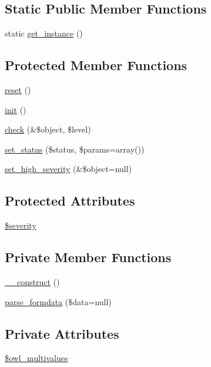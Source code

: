 \subsection*{Static Public Member Functions}
\begin{DoxyCompactItemize}
\item 
static \hyperlink{classFormHandler_ad5b352905583faed17034459f1a9ea6c}{get\_\-instance} ()
\end{DoxyCompactItemize}
\subsection*{Protected Member Functions}
\begin{DoxyCompactItemize}
\item 
\hyperlink{class__OWL_a2f2a042bcf31965194c03033df0edc9b}{reset} ()
\item 
\hyperlink{class__OWL_ae0ef3ded56e8a6b34b6461e5a721cd3e}{init} ()
\item 
\hyperlink{class__OWL_ad6f4f6946f40199dd0333cf219fa500e}{check} (\&\$object, \$level)
\item 
\hyperlink{class__OWL_aea912d0ede9b3c2a69b79072d94d4787}{set\_\-status} (\$status, \$params=array())
\item 
\hyperlink{class__OWL_a576829692a3b66e3d518853bf43abae3}{set\_\-high\_\-severity} (\&\$object=null)
\end{DoxyCompactItemize}
\subsection*{Protected Attributes}
\begin{DoxyCompactItemize}
\item 
\hyperlink{class__OWL_ad26b40a9dbbacb33e299b17826f8327c}{\$severity}
\end{DoxyCompactItemize}
\subsection*{Private Member Functions}
\begin{DoxyCompactItemize}
\item 
\hyperlink{classFormHandler_a1ef7ad4fe143dd8339c8ab66423a1934}{\_\-\_\-construct} ()
\item 
\hyperlink{classFormHandler_aef73c198dbc5de4e84f6c2a23b8b294c}{parse\_\-formdata} (\$data=null)
\end{DoxyCompactItemize}
\subsection*{Private Attributes}
\begin{DoxyCompactItemize}
\item 
\hyperlink{classFormHandler_a7aa914557e2c76b46e4e0601c5dd75d5}{\$owl\_\-multivalues}
\end{DoxyCompactItemize}
